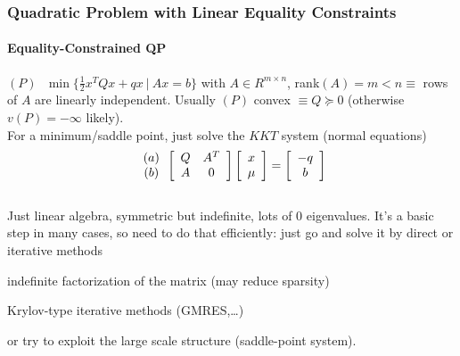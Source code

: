 \documentclass[10pt]{report}
\begin{document}
\subsubsection{Quadratic Problem with Linear Equality Constraints}
\paragraph{Equality-Constrained QP} $(P)\:\:\:\min\{\frac{1}{2}x^TQx+qx\:|\:Ax=b\}$ with $A\in R^{m\times n}$, rank$(A)=m<n \equiv$ rows of $A$ are linearly independent. Usually $(P)$ convex $\equiv Q\succeq 0$ (otherwise $v(P)=-\infty$ likely).\\
For a minimum/saddle point, just solve the $KKT$ system (normal equations)
$$\begin{array}{c}
(a)\\(b)
\end{array}\left[\begin{array}{c c}
Q&A^T\\A&0
\end{array}\right]\left[\begin{array}{c}
x\\\mu
\end{array}\right]=\left[\begin{array}{c}
-q\\b
\end{array}\right]$$\\
Just linear algebra, symmetric but indefinite, lots of 0 eigenvalues. It's a basic step in many cases, so need to do that efficiently: just go and solve it by direct or iterative methods
\begin{list}{}{}
	\item indefinite factorization of the matrix (may reduce sparsity)
	\item Krylov-type iterative methods (GMRES,\ldots)
\end{list}
or try to exploit the large scale structure (saddle-point system).
\end{document}
